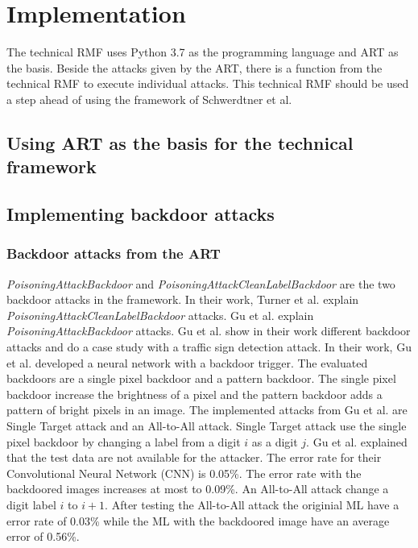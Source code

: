 \section{Implementation}
\label{sec:implementation}

The technical RMF uses Python 3.7 as the programming language and ART as the basis. Beside the attacks given by the ART, there is a function from the technical RMF to execute individual attacks. This technical RMF should be used a step ahead of using the framework of Schwerdtner et al.

\subsection{Using ART as the basis for the technical framework}

\subsection{Implementing backdoor attacks}

\subsubsection*{Backdoor attacks from the ART}

\textit{PoisoningAttackBackdoor} and \textit{PoisoningAttackCleanLabelBackdoor} are the two backdoor attacks in the framework. In their work, Turner et al. \cite{turner2018clean} explain
\textit{PoisoningAttackCleanLabelBackdoor} attacks. Gu et al. \cite{DBLP:journals/corr/abs-1708-06733} explain \textit{PoisoningAttackBackdoor} attacks. Gu et al. \cite{DBLP:journals/corr/abs-1708-06733} show in their work different backdoor attacks and do a case study with a traffic sign detection attack. In their work, Gu et al. developed a neural network with a backdoor trigger. The evaluated backdoors are a single pixel backdoor and a pattern backdoor. The single pixel backdoor increase the brightness of a pixel and the pattern backdoor adds a pattern of bright pixels in an image. The implemented attacks from Gu et al. are Single Target attack and an All-to-All attack. Single Target attack use the single pixel backdoor by changing a label from a digit $i$ as a digit $j$. Gu et al. explained that the test data are not available for the attacker. The error rate for their Convolutional Neural Network (CNN) is 0.05\%. The error rate with the backdoored images increases at most to 0.09\%. An All-to-All attack change a digit label $i$ to $i + 1$. After testing the All-to-All attack the originial ML have a error rate of 0.03\% while the ML with the backdoored image have an average error of 0.56\%.

